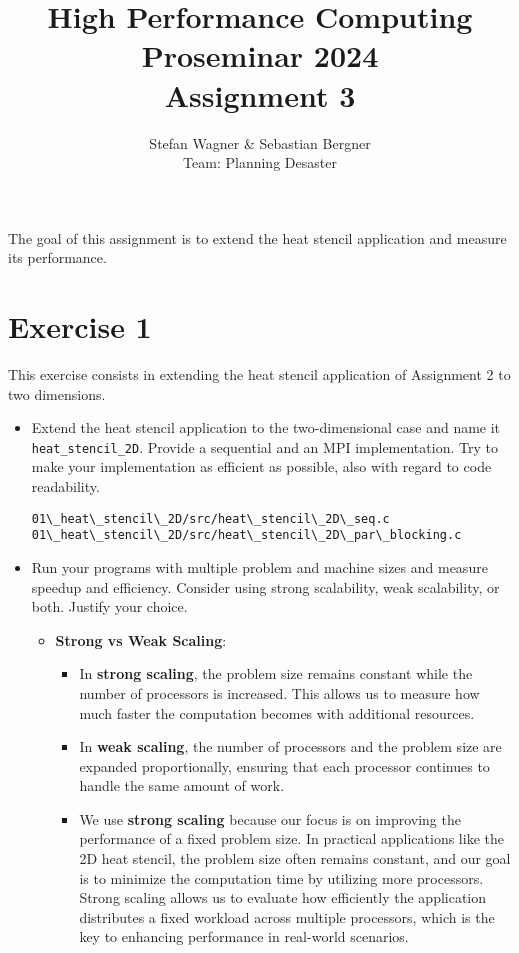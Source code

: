\documentclass[UTF-8]{article}
\title{High Performance Computing Proseminar 2024 \\
    \large Assignment 3} %
\author{Stefan Wagner \& Sebastian Bergner\\Team: Planning Desaster}
\begin{document}
    
    \maketitle
    
    The goal of this assignment is to extend the heat stencil application and measure its performance. 
    
    \section*{Exercise 1}
    This exercise consists in extending the heat stencil application of Assignment 2 to two dimensions. 
    \newline
    \begin{itemize}
    	\item Extend the heat stencil application to the two-dimensional case and name it 
            \texttt{heat\_stencil\_2D}. Provide a sequential and an MPI implementation. Try to make your implementation as efficient as possible, also with regard to code readability.
\begin{lstlisting}
01\_heat\_stencil\_2D/src/heat\_stencil\_2D\_seq.c
01\_heat\_stencil\_2D/src/heat\_stencil\_2D\_par\_blocking.c
\end{lstlisting}
    	\item Run your programs with multiple problem and machine sizes and measure speedup and 
            efficiency. Consider using strong scalability, weak scalability, or both. Justify your choice.
            \begin{itemize}
                \item \textbf{Strong vs Weak Scaling}:
                \begin{itemize}
                    \item In \textbf{strong scaling}, the problem size remains constant while the number of processors is increased. This allows us to measure how much faster the computation becomes with additional resources.
                    \item In \textbf{weak scaling}, the number of processors and the problem size are expanded proportionally, ensuring that each processor continues to handle the same amount of work.
                    \item We use \textbf{strong scaling} because our focus is on improving the performance of a fixed problem size. In practical applications like the 2D heat stencil, the problem size often remains constant, and our goal is to minimize the computation time by utilizing more processors. Strong scaling allows us to evaluate how efficiently the application distributes a fixed workload across multiple processors, which is the key to enhancing performance in real-world scenarios.

\end{itemize}
\end{itemize}
\end{itemize}
\end{document}
